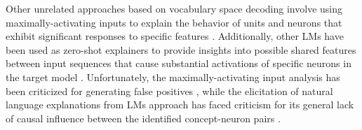 
Other unrelated approaches based on vocabulary space decoding involve using maximally-activating inputs to explain the behavior of units and neurons that exhibit significant responses to specific features \cite{dalvi2018}.
Additionally, other LMs have been used as zero-shot explainers to provide insights into possible shared features between input sequences that cause substantial activations of specific neurons in the target model \cite{bills2023}.
Unfortunately, the maximally-activating input analysis has been criticized for generating false positives \cite{bolukbasi2021}, while the elicitation of natural language explanations from LMs approach has faced criticism for its general lack of causal influence between the identified concept-neuron pairs \cite{huang2023}.